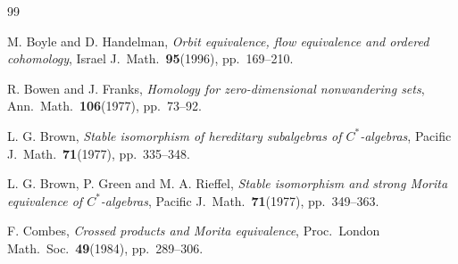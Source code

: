 \documentclass[11pt]{article}
\theoremstyle{plain}
\theoremstyle{definition}
\numberwithin{equation}{section}
\begin{document}
\begin{thebibliography}{99}






















{\sc M. Boyle and D. Handelman},
{\it Orbit equivalence, flow equivalence and ordered cohomology},
Israel J.\  Math.\
{\bf 95}(1996), pp.\ 169--210.

 {\sc R. Bowen and J. Franks},
{\it Homology for zero-dimensional nonwandering sets},
Ann.\  Math.\ {\bf 106}(1977), pp.\ 73--92.





{\sc L. G. Brown},
{\it Stable isomorphism of hereditary subalgebras of $C^*$-algebras},
Pacific J.\ Math.\ {\bf 71}(1977), pp.\ 335--348.



{\sc L. G. Brown, P. Green and M. A. Rieffel},
{\it Stable isomorphism and strong Morita equivalence of $C^*$-algebras},
 Pacific  J.\ Math.\ {\bf 71}(1977), pp.\ 349--363.



{\sc F. Combes},
{\it Crossed products and Morita equivalence},
Proc.\ London Math.\ Soc.\
{\bf 49}(1984), pp.\ 289--306.


\end{thebibliography}
\end{document}

